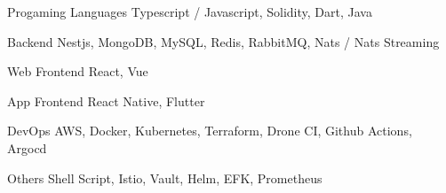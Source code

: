 


\begin{cvskills}

  \cvskill
    {Progaming Languages} %
    {Typescript / Javascript, Solidity, Dart, Java} %

  \cvskill
    {Backend} %
    {Nestjs, MongoDB, MySQL, Redis, RabbitMQ, Nats / Nats Streaming } %

  \cvskill
    {Web Frontend} %
    {React, Vue} %

  \cvskill
    {App Frontend} %
    {React Native, Flutter} %

  \cvskill
    {DevOps} %
    {AWS, Docker, Kubernetes, Terraform, Drone CI, Github Actions, Argocd} %

  \cvskill
    {Others} %
    {Shell Script, Istio, Vault, Helm, EFK, Prometheus} %


\end{cvskills}